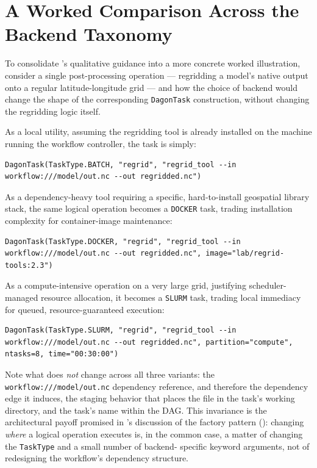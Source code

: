 \section{A Worked Comparison Across the Backend Taxonomy}

To consolidate 's qualitative guidance into a
more concrete worked illustration, consider a single post-processing
operation --- regridding a model's native output onto a regular
latitude-longitude grid --- and how the choice of backend would change the
shape of the corresponding \texttt{DagonTask} construction, without changing
the regridding logic itself.

As a local utility, assuming the regridding tool is already installed on the
machine running the workflow controller, the task is simply:
\begin{lstlisting}
DagonTask(TaskType.BATCH, "regrid", "regrid_tool --in workflow:///model/out.nc --out regridded.nc")
\end{lstlisting}

As a dependency-heavy tool requiring a specific, hard-to-install geospatial
library stack, the same logical operation becomes a \texttt{DOCKER} task,
trading installation complexity for container-image maintenance:
\begin{lstlisting}
DagonTask(TaskType.DOCKER, "regrid", "regrid_tool --in workflow:///model/out.nc --out regridded.nc", image="lab/regrid-tools:2.3")
\end{lstlisting}

As a compute-intensive operation on a very large grid, justifying scheduler-
managed resource allocation, it becomes a \texttt{SLURM} task, trading local
immediacy for queued, resource-guaranteed execution:
\begin{lstlisting}
DagonTask(TaskType.SLURM, "regrid", "regrid_tool --in workflow:///model/out.nc --out regridded.nc", partition="compute", ntasks=8, time="00:30:00")
\end{lstlisting}

\begin{practicebox}
Note what does \emph{not} change across all three variants: the
\texttt{workflow:///model/out.nc} dependency reference, and therefore the
dependency edge it induces, the staging behavior that places the file in the
task's working directory, and the task's name within the DAG. This
invariance is the architectural payoff promised in 's
discussion of the factory pattern ():
changing \emph{where} a logical operation executes is, in the common case, a
matter of changing the \texttt{TaskType} and a small number of backend-
specific keyword arguments, not of redesigning the workflow's dependency
structure.
\end{practicebox}

